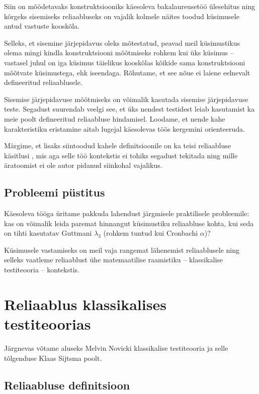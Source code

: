 \documentclass[a4paper,12pt,oneside]{article}
\numberwithin{equation}{section}
\theoremstyle{definition}
\begin{document}
Siin on mõõdetavaks konstruktsiooniks käesoleva bakalaureusetöö \"ulesehitus ning kõrgeks sisemiseks reliaabluseks on vajalik kolmele näites toodud k\"usimusele antud vastuste kooskõla. 

Selleks, et sisemine järjepidavus oleks mõtestatud, peavad meil küsimustikus olema mingi kindla konstruktsiooni mõõtmiseks rohkem kui üks küsimus -- vastasel juhul on iga küsimus täielikus kooskõlas kõikide sama konstruktsiooni mõõtvate küsimustega, ehk iseendaga. Rõhutame, et see nõue ei laiene eelnevalt defineeritud reliaablusele. 

Sisemise järjepidavuse mõõtmiseks on võimalik kasutada sisemise järjepidavuse teste. Segadust suurendab veelgi see, et üks nendest testidest leiab kasutamist ka meie poolt defineeritud reliaabluse hindamisel. Loodame, et nende kahe karakteristiku eristamine aitab lugejal käesolevas töös kergemini orienteeruda.

Märgime, et lisaks siintoodud kahele definitsioonile on ka teisi reliaabluse käsitlusi \cite{Cronbach1947}, mis aga selle töö kontekstis ei tohiks segadust tekitada ning  mille äratoomist  ei ole autor pidanud siinkohal vajalikus.


\subsection{Probleemi püstitus}

Käesoleva tööga üritame pakkuda lahendust järgmisele praktilisele probleemile: kas on võimalik leida paremat hinnangut küsimustiku reliaabluse kohta, kui seda on tihti kasutatav Guttmani $\lambda_3$ (rohkem tuntud kui Cronbachi $\alpha$)?  
 
Küsimusele vastamiseks on meil vaja  rangemat lähenemist reliaablusele ning selleks vaatleme reliaablust ühe matemaatilise raamistiku -- klassikalise testiteooria -- kontekstis.



\pagebreak


\section{Reliaablus klassikalises testiteoorias}
Järgnevas võtame aluseks Melvin Novicki klassikalise testiteooria \cite{Novick1966a}\cite{Lord1968} ja selle tõlgenduse Klaas Sijtsma poolt. \cite[109]{Sijtsma2009}

\subsection{Reliaabluse definitsioon}
\end{document}
